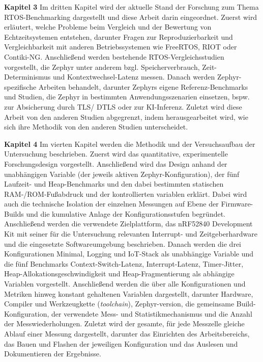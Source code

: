 \textbf{Kapitel 3 }Im dritten Kapitel wird der aktuelle Stand der Forschung zum Thema RTOS-Benchmarking dargestellt und diese Arbeit darin eingeordnet. Zuerst wird erläutert, welche Probleme beim Vergleich und der Bewertung von Echtzeitsystemen entstehen, darunter Fragen zur Reproduzierbarkeit und Vergleichbarkeit mit anderen Betriebssystemen wie FreeRTOS, RIOT oder Contiki-NG. Anschließend werden bestehende RTOS-Vergleichsstudien vorgestellt, die Zephyr unter anderem bzgl. Speicherverbrauch, Zeit-Determinismus und Kontextwechsel-Latenz messen. Danach werden Zephyr-spezifische Arbeiten behandelt, darunter Zephyrs eigene Referenz-Benchmarks und Studien, die Zephyr in bestimmten Anwendungsszenarien einsetzen, bspw. zur Absicherung durch TLS/ DTLS oder zur KI-Inferenz. Zuletzt wird diese Arbeit von den anderen Studien abgegrenzt, indem herausgearbeitet wird, wie sich ihre Methodik von den anderen Studien unterscheidet.

\textbf{Kapitel 4 }Im vierten Kapitel werden die Methodik und der Versuchsaufbau der Untersuchung beschrieben. Zuerst wird das quantitative, experimentelle Forschungsdesign vorgestellt. Anschließend wird das Design anhand der unabhängigen Variable (der jeweils aktiven Zephyr-Konfiguration), der fünf Laufzeit- und Heap-Benchmarks und den dabei bestimmten statischen RAM-/ROM-Fußabdruck und der kontrollierten variablen erklärt. Dabei wird auch die technische Isolation der einzelnen Messungen auf Ebene der Firmware-Builds und die kumulative Anlage der Konfigurationsstufen begründet. Anschließend werden die verwendete Zielplattform, das nRF52840 Development Kit mit seiner für die Untersuchung relevanten Interrupt- und Zeitgeberhardware und die eingesetzte Softwareumgebung beschrieben. Danach werden die drei Konfigurationen Minimal, Logging und IoT-Stack als unabhängige Variable und die fünf Benchmarks Context-Switch-Latenz, Interrupt-Latenz, Timer-Jitter, Heap-Allokationsgeschwindigkeit und Heap-Fragmentierung als abhängige Variablen vorgestellt. Anschließend werden die über alle Konfigurationen und Metriken hinweg konstant gehaltenen Variablen dargestellt, darunter Hardware, Compiler und Werkzeugkette (\emph{toolchain}), Zephyr-version, die gemeinsame Build-Konfiguration, der verwendete Mess- und Statistikmechanismus und die Anzahl der Messwiederholungen. Zuletzt wird der gesamte, für jede Messzelle gleiche Ablauf einer Messung dargestellt, darunter das Einrichten des Arbeitsbereichs, das Bauen und Flashen der jeweiligen Konfiguration und das Auslesen und Dokumentieren der Ergebnisse.


